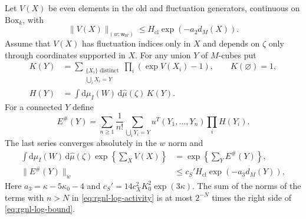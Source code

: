 \documentclass[11pt,letterpaper,reqno]{amsart}
\newcommand{\dd}{\mathrm d}
\begin{document}
\begin{proposition}\label{prop:rgnl-cluster-logarithm}
Let $V(X)$ be even elements in the old and fluctuation
generators, continuous on $\mathrm{Box}_k$, with
\[
 \|V(X)\|_{(w;\mathsf w_W)}
                       \le H_{\mathrm{cl}}\exp(-a_2d_M(X)).
\]
Assume that $V(X)$ has fluctuation indices only in $X$ and
depends on $\zeta$ only through coordinates supported in $X$.
For any union $Y$ of $M$-cubes put
\begin{align}
 K(Y)&=\sum_{\substack{\{X_i\}\text{ distinct}\\\bigcup_iX_i=Y}}
                    \prod_i(\exp V(X_i)-1),\qquad K(\varnothing)=1,
                                      \label{eq:rgnl-Mayer-activity}\\
 H(Y)&=\int\dd\mu_I(W)\,\dd\widehat\mu(\zeta)\,K(Y).
                                      \label{eq:rgnl-integrated-activity}
\end{align}
For a connected $Y$ define
\begin{equation}\label{eq:rgnl-log-activity}
 E^\#(Y)=\sum_{n\ge1}\frac1{n!}
   \sum_{\bigcup_iY_i=Y}u^T(Y_1,\ldots,Y_n)\prod_iH(Y_i).
\end{equation}
The last series converges absolutely in the $w$ norm and
\begin{align}
 \int\dd\mu_I(W)\,\dd\widehat\mu(\zeta)
                         \exp\left\{\sum_XV(X)\right\}
       &=\exp\left\{\sum_YE^\#(Y)\right\},
                                      \label{eq:rgnl-log-identity}\\
 \|E^\#(Y)\|_w
       &\le c_S'H_{\mathrm{cl}}\exp(-a_3d_M(Y)),
                                      \label{eq:rgnl-log-bound}
\end{align}
Here $a_3=\kappa-5\kappa_0-4$ and
$c_S'=14c_X^2K_0^2\exp(3\kappa)$.
The sum of the norms of the terms with $n>N$ in
\eqref{eq:rgnl-log-activity} is at most $2^{-N}$ times the
right side of \eqref{eq:rgnl-log-bound}.
\end{proposition}
\end{document}
